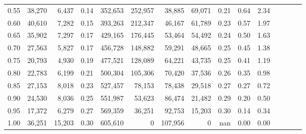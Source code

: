 \begin{tabular}{rrrcrrrrrrrrrrr}
0.55 &  38,270 &   6,437 &                                       0.14 &  352,653 &  252,957 &   38,885 &   69,071 &  0.21 &  0.64 &                         2.34 \\
0.60 &  40,610 &   7,282 &                                       0.15 &  393,263 &  212,347 &   46,167 &   61,789 &  0.23 &  0.57 &                         1.97 \\
0.65 &  35,902 &   7,297 &                                       0.17 &  429,165 &  176,445 &   53,464 &   54,492 &  0.24 &  0.50 &                         1.63 \\
0.70 &  27,563 &   5,827 &                                       0.17 &  456,728 &  148,882 &   59,291 &   48,665 &  0.25 &  0.45 &                         1.38 \\
0.75 &  20,793 &   4,930 &                                       0.19 &  477,521 &  128,089 &   64,221 &   43,735 &  0.25 &  0.41 &                         1.19 \\
0.80 &  22,783 &   6,199 &                                       0.21 &  500,304 &  105,306 &   70,420 &   37,536 &  0.26 &  0.35 &                         0.98 \\
0.85 &  27,153 &   8,018 &                                       0.23 &  527,457 &   78,153 &   78,438 &   29,518 &  0.27 &  0.27 &                         0.72 \\
0.90 &  24,530 &   8,036 &                                       0.25 &  551,987 &   53,623 &   86,474 &   21,482 &  0.29 &  0.20 &                         0.50 \\
0.95 &  17,372 &   6,279 &                                       0.27 &  569,359 &   36,251 &   92,753 &   15,203 &  0.30 &  0.14 &                         0.34 \\
1.00 &  36,251 &  15,203 &                                       0.30 &  605,610 &        0 &  107,956 &        0 &   nan &  0.00 &                         0.00 \\
\bottomrule
\end{tabular}

